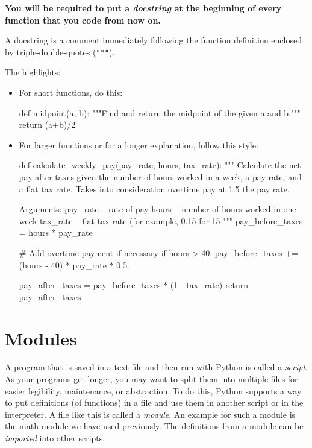 \documentclass[11pt]{cselabheader}
\begin{document}
\begin{center}
\bfseries \large You will be required to put a \emph{docstring} at the beginning
of every function that you code from now on.
\end{center}
A docstring is a comment immediately
following the function definition enclosed by triple-double-quotes (\texttt{"""}).

The highlights:
\begin{itemize}
  \item For short functions, do this:

    \begin{python3code}
def midpoint(a, b):
    """Find and return the midpoint of the given a and b."""
    return (a+b)/2
    \end{python3code}

  \item For larger functions or for a longer explanation, follow this style:

    \begin{python3code}
def calculate_weekly_pay(pay_rate, hours, tax_rate):
    """
    Calculate the net pay after taxes given the number of hours worked 
    in a week, a pay rate, and a flat tax rate.
    Takes into consideration overtime pay at 1.5 the pay rate.

    Arguments:
    pay_rate -- rate of pay
    hours -- number of hours worked in one week
    tax_rate -- flat tax rate (for example, 0.15 for 15%
    """
    pay_before_taxes = hours * pay_rate

    # Add overtime payment if necessary
    if hours > 40:
        pay_before_taxes += (hours - 40) * pay_rate * 0.5

    pay_after_taxes = pay_before_taxes * (1 - tax_rate)
    return pay_after_taxes
    \end{python3code}

\end{itemize}

\pagebreak
\section{Modules}
\label{sec:modules}

A program that is saved in a text file and then run with Python is called a
\emph{script}. As your programs get longer, you may want to split them into
multiple files for easier legibility, maintenance, or abstraction. To do this,
Python supports a way to put definitions (of functions) in a file and use them
in another script or in the interpreter. A file like this is called a
\emph{module}. An example for such a module is the math module we have used
previously. The definitions from a module can be \emph{imported} into other
scripts.
\end{document}
